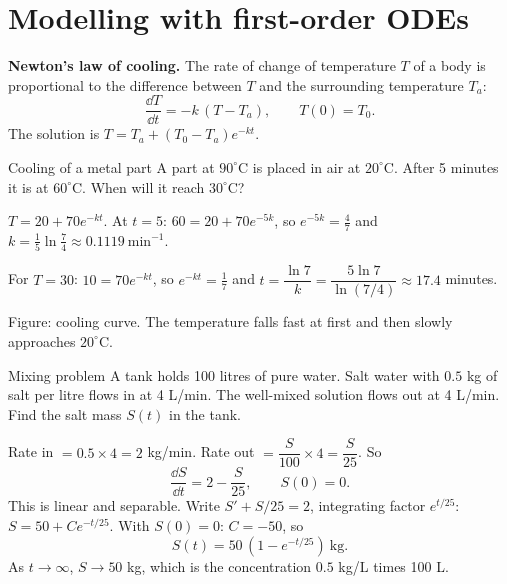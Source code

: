 \section{Modelling with first-order ODEs}

\textbf{Newton's law of cooling.} The rate of change of temperature $T$ of a body is proportional to the difference between $T$ and the surrounding temperature $T_a$:
\[ \frac{\dd T}{\dd t} = -k\,(T - T_a), \qquad T(0)=T_0 . \]
The solution is $T = T_a + (T_0 - T_a)e^{-kt}$.

\begin{examplebox}{Cooling of a metal part}
A part at $90^\circ$C is placed in air at $20^\circ$C. After 5 minutes it is at $60^\circ$C. When will it reach $30^\circ$C?

$T = 20 + 70e^{-kt}$. At $t=5$: $60 = 20 + 70e^{-5k}$, so $e^{-5k} = \tfrac47$ and $k = \tfrac15\ln\tfrac74 \approx 0.1119\ \text{min}^{-1}$.

For $T=30$: $10 = 70e^{-kt}$, so $e^{-kt} = \tfrac17$ and $t = \dfrac{\ln 7}{k} = \dfrac{5\ln 7}{\ln(7/4)} \approx 17.4$ minutes.
\end{examplebox}

\begin{center}

{\small Figure: cooling curve. The temperature falls fast at first and then slowly approaches $20^\circ$C.}
\end{center}

\begin{examplebox}{Mixing problem}
A tank holds 100 litres of pure water. Salt water with $0.5$ kg of salt per litre flows in at 4 L/min. The well-mixed solution flows out at 4 L/min. Find the salt mass $S(t)$ in the tank.

Rate in $= 0.5 \times 4 = 2$ kg/min. Rate out $= \dfrac{S}{100}\times 4 = \dfrac{S}{25}$. So
\[ \frac{\dd S}{\dd t} = 2 - \frac{S}{25}, \qquad S(0)=0. \]
This is linear and separable. Write $S' + S/25 = 2$, integrating factor $e^{t/25}$:
$S = 50 + Ce^{-t/25}$. With $S(0)=0$: $C=-50$, so
\[ S(t) = 50\,(1 - e^{-t/25}) \ \text{kg}. \]
As $t\to\infty$, $S\to 50$ kg, which is the concentration $0.5$ kg/L times 100 L.
\end{examplebox}


